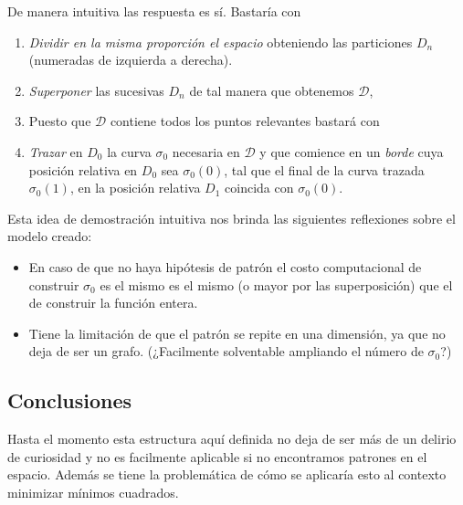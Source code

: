 De manera intuitiva las respuesta es sí. Bastaría con
\begin{enumerate}
 \item \textit{Dividir en la misma proporción el espacio} obteniendo las particiones $D_n$ (numeradas de izquierda a derecha).
 \item \textit{Superponer} las sucesivas $D_n$ de tal manera que obtenemos $\mathcal{D}$,
 \item Puesto que $\mathcal{D}$ contiene todos los puntos relevantes bastará con
 \item \textit{Trazar} en $D_0$ la curva $\sigma_0$ necesaria en  $\mathcal{D}$ y que 
  comience en un \textit{borde} cuya  posición relativa en $D_0$ sea 
  $\sigma_0(0)$, tal que el final de la curva trazada $\sigma_0(1)$, en la posición relativa 
  $D_1$  coincida con $\sigma_0(0)$. 
\end{enumerate}


Esta idea  de demostración intuitiva nos brinda las siguientes reflexiones 
sobre el modelo creado: 

\begin{itemize}
    \item En caso de que no haya hipótesis de patrón el costo computacional de construir 
    $\sigma_0$ es el mismo es el mismo (o mayor por las superposición) que el de construir la función entera. 

    \item Tiene la limitación de que el patrón se repite en una dimensión, ya que no deja de ser un grafo.
    (¿Facilmente solventable  ampliando el número de $\sigma_0$?)
\end{itemize}

\subsection{Conclusiones}

Hasta el momento esta estructura aquí definida no deja de ser más de un delirio de curiosidad 
y no es facilmente aplicable si no encontramos patrones en el espacio. 
Además se tiene la problemática de cómo se aplicaría esto al contexto
 minimizar mínimos cuadrados. 




